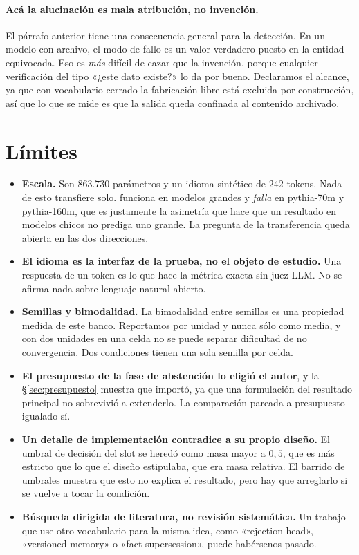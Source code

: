 \documentclass[11pt,a4paper]{article}
\begin{document}
\paragraph{Acá la alucinación es mala atribución, no invención.} El párrafo anterior tiene una
consecuencia general para la detección. En un modelo con archivo, el modo de fallo es un valor
verdadero puesto en la entidad equivocada. Eso es \emph{más} difícil de cazar que la invención,
porque cualquier verificación del tipo «¿este dato existe?» lo da por bueno. Declaramos el alcance,
ya que con vocabulario cerrado la fabricación libre está excluida por construcción, así que lo que se
mide es que la salida queda confinada al contenido archivado.

\section{Límites}
\label{sec:limites}

\begin{itemize}
\item \textbf{Escala.} Son $863{.}730$ parámetros y un idioma sintético de $242$ tokens. Nada de esto
transfiere solo. \citet{cohen2024idk} funciona en modelos grandes y \emph{falla} en pythia-70m y
pythia-160m, que es justamente la asimetría que hace que un resultado en modelos chicos no prediga
uno grande. La pregunta de la transferencia queda abierta en las dos direcciones.
\item \textbf{El idioma es la interfaz de la prueba, no el objeto de estudio.} Una respuesta de un
token es lo que hace la métrica exacta sin juez LLM. No se afirma nada sobre lenguaje natural
abierto.
\item \textbf{Semillas y bimodalidad.} La bimodalidad entre semillas es una propiedad medida de este
banco. Reportamos por unidad y nunca sólo como media, y con dos unidades en una celda no se puede
separar dificultad de no convergencia. Dos condiciones tienen una sola semilla por celda.
\item \textbf{El presupuesto de la fase de abstención lo eligió el autor}, y la §\ref{sec:presupuesto}
muestra que importó, ya que una formulación del resultado principal no sobrevivió a extenderlo. La
comparación pareada a presupuesto igualado sí.
\item \textbf{Un detalle de implementación contradice a su propio diseño.} El umbral de decisión del
slot se heredó como masa mayor a $0{,}5$, que es más estricto que lo que el diseño estipulaba, que
era masa relativa. El barrido de umbrales muestra que esto no explica el resultado, pero hay que
arreglarlo si se vuelve a tocar la condición.
\item \textbf{Búsqueda dirigida de literatura, no revisión sistemática.} Un trabajo que use otro
vocabulario para la misma idea, como «rejection head», «versioned memory» o «fact supersession»,
puede habérsenos pasado.
\end{itemize}
\end{document}
